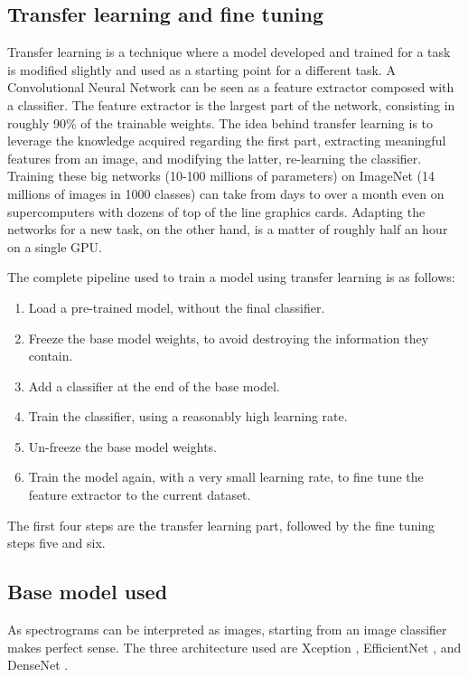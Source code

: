 \subsection{Transfer learning and fine tuning}

Transfer learning is a technique where a model developed and trained for a task
is modified slightly and used as a starting point for a different task.
A Convolutional Neural Network can be seen as a feature extractor composed with
a classifier.
The feature extractor is the largest part of the network, consisting in roughly
90\% of the trainable weights.
The idea behind transfer learning is to leverage the knowledge acquired
regarding the first part, extracting meaningful features from an image, and
modifying the latter, re-learning the classifier.
Training these big networks (10-100 millions of parameters) on ImageNet (14
millions of images in 1000 classes) can take from days to over a month even on
supercomputers with dozens of top of the line graphics cards.
Adapting the networks for a new task, on the other hand, is a matter of roughly
half an hour on a single GPU.

The complete pipeline used to train a model using transfer learning is as
follows:
\begin{enumerate}
    \item Load a pre-trained model, without the final classifier.
    \item Freeze the base model weights, to avoid destroying the information they
        contain.
    \item Add a classifier at the end of the base model.
    \item Train the classifier, using a reasonably high learning rate.
    \item Un-freeze the base model weights.
    \item Train the model again, with a very small learning rate, to fine tune
        the feature extractor to the current dataset.
\end{enumerate}
The first four steps are the transfer learning part, followed by the fine
tuning steps five and six.

\subsection{Base model used}

As spectrograms can be interpreted as images, starting from an image classifier
makes perfect sense. The three architecture used are
Xception 
\cite{chollet2017xception},
EfficientNet
\cite{tan2020efficientnet},
and
DenseNet
\cite{huang2018densely}.

